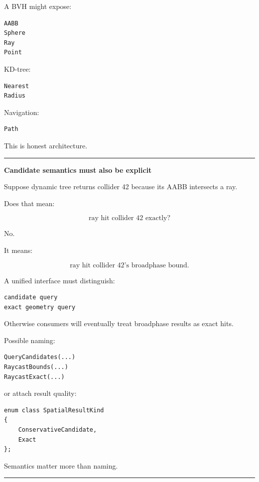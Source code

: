 A BVH might expose:

\begin{verbatim}
AABB
Sphere
Ray
Point
\end{verbatim}

KD-tree:

\begin{verbatim}
Nearest
Radius
\end{verbatim}

Navigation:

\begin{verbatim}
Path
\end{verbatim}

This is honest architecture.

\begin{center}\rule{0.5\linewidth}{0.5pt}\end{center}

\textbf{Candidate semantics must also be explicit}

Suppose dynamic tree returns collider 42 because its AABB intersects a ray.

Does that mean:

\[
\text{ray hit collider 42 exactly}?
\]

No.

It means:

\[
\text{ray hit collider 42's broadphase bound}.
\]

A unified interface must distinguish:

\begin{verbatim}
candidate query
exact geometry query
\end{verbatim}

Otherwise consumers will eventually treat broadphase results as exact hits.

Possible naming:

\begin{verbatim}
QueryCandidates(...)
RaycastBounds(...)
RaycastExact(...)
\end{verbatim}

or attach result quality:

\begin{verbatim}
enum class SpatialResultKind
{
    ConservativeCandidate,
    Exact
};
\end{verbatim}

Semantics matter more than naming.

\begin{center}\rule{0.5\linewidth}{0.5pt}\end{center}

